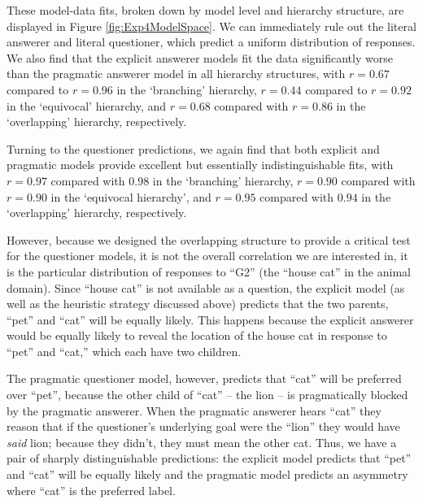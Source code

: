 \documentclass[12pt, floatsintext, man]{apa6}
\begin{document}
These model-data fits, broken down by model level and hierarchy structure, are displayed in Figure \ref{fig:Exp4ModelSpace}. We can immediately rule out the literal answerer and literal questioner, which predict a uniform distribution of responses. We also find that the explicit answerer models fit the data significantly worse than the pragmatic answerer model in all hierarchy structures, with $r = 0.67$ compared to $r = 0.96$ in the `branching' hierarchy, $r = 0.44$ compared to $r = 0.92$ in the `equivocal' hierarchy, and $r = 0.68$ compared with $r = 0.86$ in the `overlapping' hierarchy, respectively. 

Turning to the questioner predictions, we again find that both explicit and pragmatic models provide excellent but essentially indistinguishable fits, with $r = 0.97$ compared with $0.98$ in the `branching' hierarchy, $r = 0.90$ compared with $r = 0.90$ in the `equivocal hierarchy', and $r = 0.95$ compared with $0.94$ in the `overlapping' hierarchy, respectively. 

However, because we designed the overlapping structure to provide a critical test for the questioner models, it is not the overall correlation we are interested in, it is the particular distribution of responses to ``G2'' (the ``house cat'' in the animal domain). Since ``house cat'' is not available as a question, the explicit model (as well as the heuristic strategy discussed above) predicts that the two parents, ``pet'' and ``cat'' will be equally likely. This happens because the explicit answerer would be equally likely to reveal the location of the house cat in response to ``pet'' and ``cat,'' which each have two children. 

The pragmatic questioner model, however, predicts that ``cat'' will be preferred over ``pet'', because the other child of ``cat'' -- the lion -- is pragmatically blocked by the pragmatic answerer. When the pragmatic answerer hears ``cat'' they reason that if the questioner's underlying goal were the ``lion'' they would have \emph{said} lion; because they didn't, they must mean the other cat. Thus, we have a pair of sharply distinguishable predictions: the explicit model predicts that ``pet'' and ``cat'' will be equally likely and the pragmatic model predicts an asymmetry where ``cat'' is the preferred label. 
\end{document}
